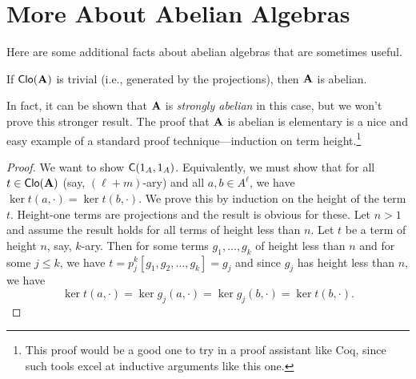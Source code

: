 \appendix


\section{More About Abelian Algebras}
\label{sec:abelian-algebras}
Here are some additional facts about abelian algebras that are sometimes useful.

\begin{lem}
If $\operatorname{\mathsf{Clo}}(\mathbf{A})$ is trivial (i.e., generated by the projections),
then $\mathbf{A}$ is abelian.
\end{lem}
In fact, it can be shown that $\mathbf{A}$ is \emph{strongly abelian} in this case, but
we won't prove this stronger result. The proof that $\mathbf{A}$ is abelian is
elementary is a nice and easy example of a standard proof technique---induction on
term height.\footnote{This proof would be a good one to try in a proof assistant
  like Coq, since such tools excel at inductive arguments like this one.}
\begin{proof}
We want to show $\mathsf{C}(1_A, 1_A)$.  Equivalently, we must show
that for all $t\in \operatorname{\mathsf{Clo}}(\mathbf{A})$ (say, $(\ell+m)$-ary) 
and all $a, b \in A^\ell$, we have $\ker t(a,\cdot)=\ker t(b,\cdot)$.
We prove this by induction on the height of the term $t$.  Height-one terms are
projections and the result is obvious for these.  Let $n>1$ and assume the result
holds for all terms  of height less than
$n$.  Let $t$ be a term of height $n$, say, $k$-ary.  Then for some terms 
$g_1, \dots, g_k$ of height less than $n$ and for some $j\leq k$, we have
$t = p^k_j [g_1, g_2, \dots, g_k] = g_j$ and since $g_j$ has height less than
$n$, we have
\[
\ker t(a,\cdot)=\ker g_j(a,\cdot) = \ker g_j(b,\cdot)=\ker t(b,\cdot).
\]\end{proof}



